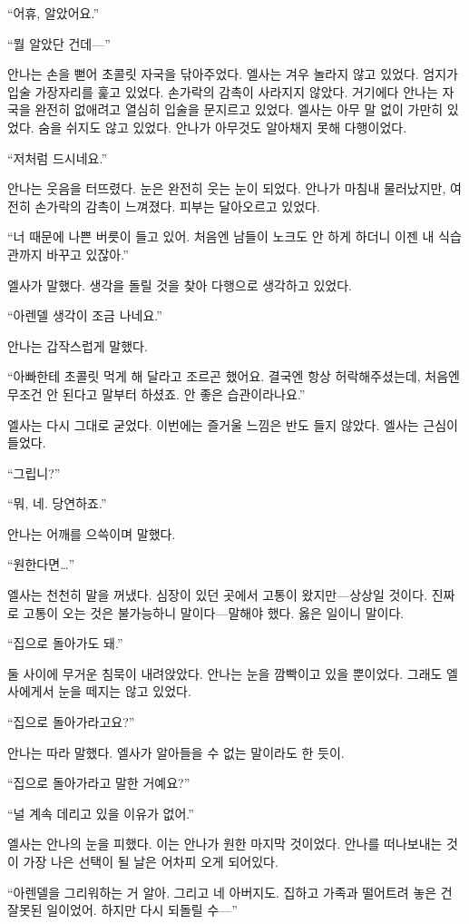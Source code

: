 ``어휴, 알았어요.''

``뭘 알았단 건데—''

안나는 손을 뻗어 초콜릿 자국을 닦아주었다. 엘사는 겨우 놀라지 않고 있었다. 엄지가 입술 가장자리를 훑고 있었다. 손가락의 감촉이 사라지지 않았다. 거기에다 안나는 자국을 완전히 없애려고 열심히 입술을 문지르고 있었다. 엘사는 아무 말 없이 가만히 있었다. 숨을 쉬지도 않고 있었다. 안나가 아무것도 알아채지 못해 다행이었다.

``저처럼 드시네요.''

안나는 웃음을 터뜨렸다. 눈은 완전히 웃는 눈이 되었다. 안나가 마침내 물러났지만, 여전히 손가락의 감촉이 느껴졌다. 피부는 달아오르고 있었다.

``너 때문에 나쁜 버릇이 들고 있어. 처음엔 남들이 노크도 안 하게 하더니 이젠 내 식습관까지 바꾸고 있잖아.''

엘사가 말했다. 생각을 돌릴 것을 찾아 다행으로 생각하고 있었다.

``아렌델 생각이 조금 나네요.''

안나는 갑작스럽게 말했다.

``아빠한테 초콜릿 먹게 해 달라고 조르곤 했어요. 결국엔 항상 허락해주셨는데, 처음엔 무조건 안 된다고 말부터 하셨죠. 안 좋은 습관이라나요.''

엘사는 다시 그대로 굳었다. 이번에는 즐거울 느낌은 반도 들지 않았다. 엘사는 근심이 들었다.

`` 그립니?''

``뭐, 네. 당연하죠.''

안나는 어깨를 으쓱이며 말했다.

``원한다면\ldots''

엘사는 천천히 말을 꺼냈다. 심장이 있던 곳에서 고통이 왔지만—상상일 것이다. 진짜로 고통이 오는 것은 불가능하니 말이다—말해야 했다. 옳은 일이니 말이다.

``집으로 돌아가도 돼.''

둘 사이에 무거운 침묵이 내려앉았다. 안나는 눈을 깜빡이고 있을 뿐이었다. 그래도 엘사에게서 눈을 떼지는 않고 있었다.

``집으로 돌아가라고요?''

안나는 따라 말했다. 엘사가 알아들을 수 없는 말이라도 한 듯이.

``집으로 돌아가라고 말한 거예요?''

``널 계속 데리고 있을 이유가 없어.''

엘사는 안나의 눈을 피했다. 이는 안나가 원한 마지막 것이었다. 안나를 떠나보내는 것이 가장 나은 선택이 될 날은 어차피 오게 되어있다.

``아렌델을 그리워하는 거 알아. 그리고 네 아버지도. 집하고 가족과 떨어트려 놓은 건 잘못된 일이었어. 하지만 다시 되돌릴 수—''

